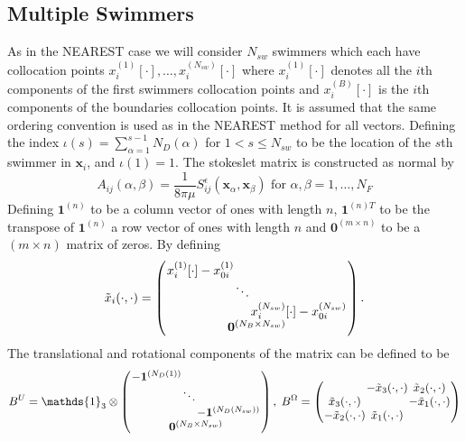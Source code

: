 \subsection{Multiple Swimmers}
As in the NEAREST case we will consider $N_{sw}$ swimmers which each have collocation points $x_i^{(1)}[\cdot],\dots,x_i^{(N_{sw})}[\cdot]$ where $x_i^{(1)}[\cdot]$ denotes all the $i$th components of the first swimmers collocation points and $x_i^{(B)}[\cdot]$ is the $i$th components of the boundaries collocation points. It is assumed that the same ordering convention is used as in the NEAREST method for all vectors.
Defining the index $\iota(s)=\sum_{\alpha=1}^{s-1}N_D(\alpha)$ for $1<s\leq N_{sw}$ to be the location of the $s$th swimmer in $\bm{x}_i$, and $\iota(1)=1$. The stokeslet matrix is constructed as normal by
\begin{equation*}
    A_{ij}(\alpha,\beta) = \frac{1}{8\pi\mu} S_{ij}^\epsilon (\bm{x}_\alpha,\bm{x}_{\beta}) \text { for } \alpha,\beta = 1,\dots,N_F
\end{equation*}
Defining $\bm{1}^{(n)}$ to be a column vector of ones with length $n$, $\bm{1}^{(n)T}$ to be the transpose of $\bm{1}^{(n)}$ a row vector of ones with length $n$ and $\bm{0}^{(m\times n)}$ to be a $(m\times n)$ matrix of zeros. By defining
\begin{equation*}
\arraycolsep=0.4pt\def\arraystretch{1}
    \tilde{x}_i(\cdot,\cdot)=\left(\begin{array}{c}
         \begin{array}{ccc}
             x_i^{(1)}[\cdot]-x_{0i}^{(1)} & & \\
              & \ddots & \\
              & & x_i^{(N_{sw})}[\cdot]-x_{0i}^{(N_{sw})}
         \end{array}\\
         \bm{0}^{(N_B \times N_{sw})}
    \end{array}\right).
\end{equation*}
The translational and rotational components of the matrix can be defined to be
\begin{equation*}
\arraycolsep=0.4pt\def\arraystretch{1}
    B^U = \mathds{1}_{3} \otimes \left(\begin{array}{c}
         \begin{array}{ccc}
             -\bm{1}^{(N_D(1))} & & \\
              & \ddots & \\
              & & -\bm{1}^{(N_D(N_{sw}))}
         \end{array}\\
         \bm{0}^{(N_B \times N_{sw})}
    \end{array}\right), \;
    B^\Omega =
    \left(\begin{array}{ccc}
             & -\tilde{x}_3(\cdot,\cdot) & \tilde{x}_2(\cdot,\cdot)\\
            \tilde{x}_3(\cdot,\cdot) & & -\tilde{x}_1(\cdot,\cdot)\\
            -\tilde{x}_2(\cdot,\cdot) & \tilde{x}_1(\cdot,\cdot) &
          \end{array}\right)
\end{equation*}
